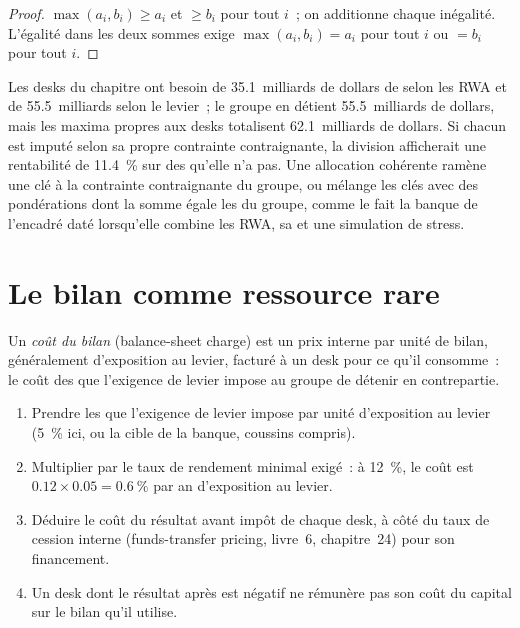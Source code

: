 \begin{proof}
$\max(a_i,b_i)\ge a_i$ et $\ge b_i$ pour tout $i$~; on additionne chaque inégalité. L'égalité dans les deux sommes exige $\max(a_i,b_i)=a_i$ pour tout $i$ ou
$=b_i$ pour tout $i$.
\end{proof}

Les desks du chapitre ont besoin de 35.1~milliards de dollars de  selon les RWA et de 55.5~milliards selon le levier~; le groupe en détient 55.5~milliards de dollars, mais les maxima propres aux desks
totalisent 62.1~milliards de dollars. Si chacun est imputé selon sa propre contrainte contraignante, la division afficherait une rentabilité de 11.4~\% sur des  qu'elle n'a
pas. Une allocation cohérente ramène une clé à la contrainte contraignante du groupe, ou mélange les clés avec des pondérations dont la somme égale les  du groupe,
comme le fait la banque de l'encadré daté lorsqu'elle combine les RWA, sa  et une simulation de stress.

\section{Le bilan comme ressource rare}

\begin{definition}\label{def:fm:the-bank-markets-division:charge}
Un \emph{coût du bilan} (balance-sheet charge) est un prix interne par unité de bilan, généralement d'exposition au levier, facturé
à un desk pour ce qu'il consomme~: le coût des  que l'exigence de levier impose au groupe de détenir en contrepartie.
\end{definition}

\begin{method}\label{met:fm:the-bank-markets-division:charge}
\begin{enumerate}
\item Prendre les  que l'exigence de levier impose par unité d'exposition au levier (5~\% ici, ou la cible de la banque, coussins compris).
\item Multiplier par le taux de rendement minimal exigé~: à 12~\%, le coût est $0.12\times0.05=0.6~\%$ par an d'exposition au levier.
\item Déduire le coût du résultat avant impôt de chaque desk, à côté du taux de cession interne (funds-transfer pricing, livre~6, chapitre~24) pour son financement.
\item Un desk dont le résultat après  est négatif ne rémunère pas son coût du capital sur le bilan qu'il utilise.
\end{enumerate}
\end{method}

